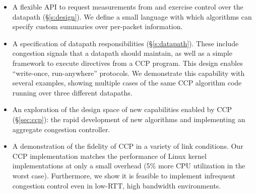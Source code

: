 \begin{itemize}
\item A flexible API to request measurements from and exercise control over the datapath (\S\ref{s:design}). We define a small language with which algorithms can specify custom summaries over per-packet information. 

\item A specification of datapath responsibilities (\S\ref{s:datapath}). These include congestion signals that a datapath should maintain, as well as a simple framework to execute directives from a CCP program. This design enables ``write-once, run-anywhere'' protocols. We demonstrate this capability with several examples, showing multiple cases of the same CCP algorithm code running over three different datapaths. 

\item An exploration of the design space of new capabilities enabled by CCP (\S\ref{sec:ccp}): the rapid development of new algorithms and implementing an aggregate congestion controller.

\item A demonstration of the fidelity of CCP in a variety of link conditions. Our CCP implementation matches the performance of Linux kernel implementations at only a small overhead (5\% more CPU utilization in the worst case). Furthermore, we show it is feasible to implement infrequent congestion control even in low-RTT, high bandwidth environments.

\end{itemize}


%
%
%    
%    
%    
%
%
%
%
%